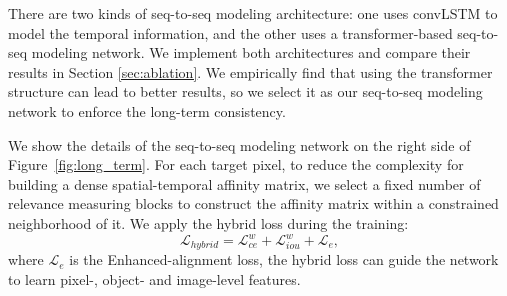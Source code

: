 \documentclass[10pt,twocolumn,letterpaper]{article}
\def\figref#1{Figure~\ref{#1}}
\begin{document}
There are two kinds of seq-to-seq modeling architecture: one uses convLSTM to model the temporal information, and the other uses a transformer-based seq-to-seq modeling network. We implement both architectures and compare their results in Section \ref{sec:ablation}. We empirically find that using the transformer structure can lead to better results, so we select it as our seq-to-seq modeling network to enforce the long-term consistency.

We show the details of the seq-to-seq modeling network on the right side of \figref{fig:long_term}. For each target pixel, to reduce the complexity for building a dense spatial-temporal affinity matrix, we select a fixed number of relevance measuring blocks to construct the affinity matrix within a constrained neighborhood of it.
We apply the hybrid loss \cite{21Fan_HybridLoss} during the training: 
\begin{equation}
    \mathcal{L}_{hybrid} = \mathcal{L}^{w}_{ce} + \mathcal{L}^{w}_{iou} + \mathcal{L}_{e},
\end{equation}
where $\mathcal{L}_{e}$ is the Enhanced-alignment loss, the hybrid loss can guide the network to learn pixel-, object- and image-level features.
\end{document}
